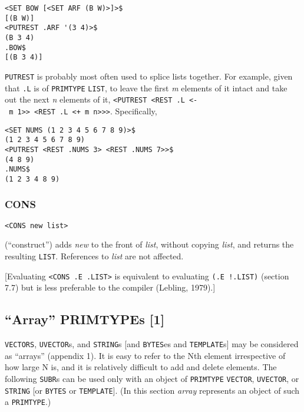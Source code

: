 \documentclass[a4paper]{scrbook}
\begin{document}
\begin{verbatim}
<SET BOW [<SET ARF (B W)>]>$
[(B W)]
<PUTREST .ARF '(3 4)>$
(B 3 4)
.BOW$
[(B 3 4)]
\end{verbatim}

\texttt{PUTREST} is probably most often used to splice lists together. For example, given that \texttt{.L} is of
\texttt{PRIMTYPE} \texttt{LIST}, to leave the first \emph{m} elements of it intact and take out the next \emph{n} elements
of it,
\texttt{\textless{}PUTREST\ \textless{}REST\ .L\ \textless{}-\ m\ 1\textgreater{}\textgreater{}\ \textless{}REST\ .L\ \textless{}+\ m\ n\textgreater{}\textgreater{}\textgreater{}}.
Specifically,

\begin{verbatim}
<SET NUMS (1 2 3 4 5 6 7 8 9)>$
(1 2 3 4 5 6 7 8 9)
<PUTREST <REST .NUMS 3> <REST .NUMS 7>>$
(4 8 9)
.NUMS$
(1 2 3 4 8 9)
\end{verbatim}

\subsubsection{CONS}\label{cons}

\begin{verbatim}
<CONS new list>
\end{verbatim}

 (``construct'') adds \emph{new} to the front of \emph{list}, without copying \emph{list}, and
returns the resulting \texttt{LIST}. References to \emph{list} are not affected.

{[}Evaluating \texttt{\textless{}CONS\ .E\ .LIST\textgreater{}} is equivalent to evaluating \texttt{(.E\ !.LIST)} (section
7.7) but is less preferable to the compiler (Lebling, 1979).{]}

\subsection{\texorpdfstring{``Array'' PRIMTYPEs
{[}1{]}}{7.6.2. Array PRIMTYPEs {[}1{]}}}\label{array-primtypes-1}

\texttt{VECTORS}, \texttt{UVECTOR}s, and \texttt{STRING}s {[}and \texttt{BYTES}es and \texttt{TEMPLATE}s{]} may be
considered as ``arrays'' (appendix 1). It is easy to refer to the Nth element irrespective of how large N is, and it is
relatively difficult to add and delete elements. The following \texttt{SUBR}s can be used only with an object of
\texttt{PRIMTYPE} \texttt{VECTOR}, \texttt{UVECTOR}, or \texttt{STRING} {[}or \texttt{BYTES} or \texttt{TEMPLATE}{]}. (In
this section \emph{array} represents an object of such a \texttt{PRIMTYPE}.)
\end{document}
